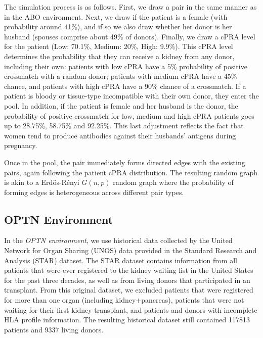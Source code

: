 \documentclass[format=acmsmall, review=false]{acmart}
\begin{document}
The simulation process is as follows. First, we draw a pair in the same manner as in the ABO environment. Next, we draw if the patient is a female (with probability around 41\%), and if so we also draw whether her donor is her husband (spouses comprise about 49\% of donors). Finally, we draw a  cPRA level for the patient (Low: 70.1\%, Medium: 20\%, High: 9.9\%). This cPRA level determines the probability that they can receive a kidney from any donor, including their own: patients with low cPRA have a 5\% probability of positive crossmatch with a random donor; patients with medium cPRA have a 45\% chance, and patients with high cPRA have a 90\% chance of a crossmatch. If a patient is bloody or tissue-type incompatible with their own donor, they enter the pool. In addition, if the patient is female and her husband is the donor, the probability of positive crossmatch for low, medium and high cPRA patients goes up to 28.75\%, 58.75\% and 92.25\%. This last adjustment reflects the fact that women tend to produce antibodies against their husbands' antigens during pregnancy.

Once in the pool, the pair immediately forms directed edges with the existing pairs, again following the patient cPRA distribution. The resulting random graph is akin to a Erd\"{o}s-R\'{e}nyi $G(n,p)$ random graph where the probability of forming edges is heterogeneous across different pair types.

\subsection{OPTN Environment}

In the \emph{OPTN environment}, we use historical data collected by the United Network for Organ Sharing (UNOS) data provided in the Standard Research and Analysis (STAR) dataset. The STAR dataset contains information from all patients that were ever registered to the kidney waiting list in the United States for the past three decades, as well as from living donors that participated in an transplant. From this original dataset, we excluded patients that were registered for more than one organ (including kidney+pancreas), patients that were not waiting for their first kidney transplant, and patients and donors with incomplete HLA profile information. The resulting historical dataset still contained 117813 patients and 9337 living donors.
\end{document}
